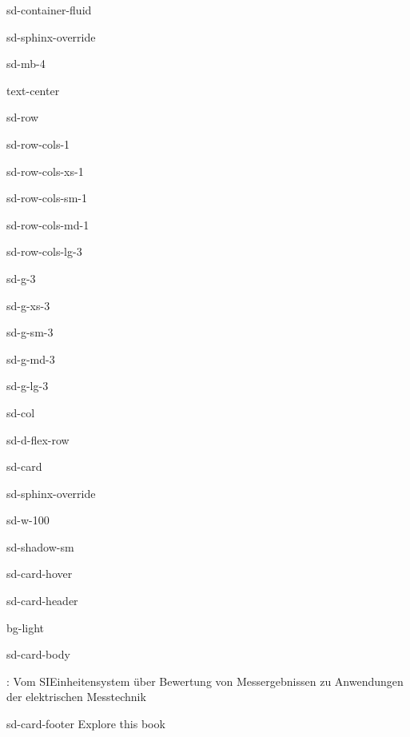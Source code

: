 \documentclass[letterpaper,10pt,english]{jupyterBook}
\let\sphinxpxdimen\pdfpxdimen\else\newdimen\sphinxpxdimen
\begin{document}
\begin{sphinxuseclass}{sd-container-fluid}
\begin{sphinxuseclass}{sd-sphinx-override}
\begin{sphinxuseclass}{sd-mb-4}
\begin{sphinxuseclass}{text-center}
\begin{sphinxuseclass}{sd-row}
\begin{sphinxuseclass}{sd-row-cols-1}
\begin{sphinxuseclass}{sd-row-cols-xs-1}
\begin{sphinxuseclass}{sd-row-cols-sm-1}
\begin{sphinxuseclass}{sd-row-cols-md-1}
\begin{sphinxuseclass}{sd-row-cols-lg-3}
\begin{sphinxuseclass}{sd-g-3}
\begin{sphinxuseclass}{sd-g-xs-3}
\begin{sphinxuseclass}{sd-g-sm-3}
\begin{sphinxuseclass}{sd-g-md-3}
\begin{sphinxuseclass}{sd-g-lg-3}
\begin{sphinxuseclass}{sd-col}
\begin{sphinxuseclass}{sd-d-flex-row}
\begin{sphinxuseclass}{sd-card}
\begin{sphinxuseclass}{sd-sphinx-override}
\begin{sphinxuseclass}{sd-w-100}
\begin{sphinxuseclass}{sd-shadow-sm}
\begin{sphinxuseclass}{sd-card-hover}
\begin{sphinxuseclass}{sd-card-header}
\begin{sphinxuseclass}{bg-light}
\sphinxAtStartPar
{}

\end{sphinxuseclass}
\end{sphinxuseclass}
\begin{sphinxuseclass}{sd-card-body}
\noindent\sphinxincludegraphics[height=150\sphinxpxdimen]{{2020_Book_Messtechnik}.png}

\sphinxAtStartPar
{}: Vom SI\sphinxhyphen{}Einheitensystem über Bewertung von Messergebnissen zu Anwendungen der elektrischen Messtechnik

\end{sphinxuseclass}
\begin{sphinxuseclass}{sd-card-footer}
\sphinxAtStartPar
Explore this book 


\end{sphinxuseclass}
\end{sphinxuseclass}
\end{sphinxuseclass}
\end{sphinxuseclass}
\end{sphinxuseclass}
\end{sphinxuseclass}
\end{sphinxuseclass}
\end{sphinxuseclass}
\end{sphinxuseclass}
\end{sphinxuseclass}
\end{sphinxuseclass}
\end{sphinxuseclass}
\end{sphinxuseclass}
\end{sphinxuseclass}
\end{sphinxuseclass}
\end{sphinxuseclass}
\end{sphinxuseclass}
\end{sphinxuseclass}
\end{sphinxuseclass}
\end{sphinxuseclass}
\end{sphinxuseclass}
\end{sphinxuseclass}
\end{sphinxuseclass}
\end{document}
